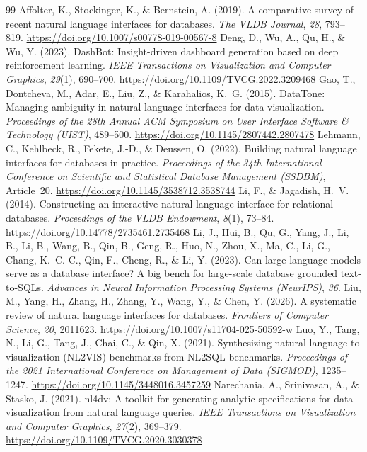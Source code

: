 \documentclass[11pt]{article}
\begin{document}
\begin{thebibliography}{99}
 Affolter, K., Stockinger, K., \& Bernstein, A. (2019). A comparative survey of recent natural language interfaces for databases. \emph{The VLDB Journal}, \emph{28}, 793--819. \url{https://doi.org/10.1007/s00778-019-00567-8}
 Deng, D., Wu, A., Qu, H., \& Wu, Y. (2023). DashBot: Insight-driven dashboard generation based on deep reinforcement learning. \emph{IEEE Transactions on Visualization and Computer Graphics}, \emph{29}(1), 690--700. \url{https://doi.org/10.1109/TVCG.2022.3209468}
 Gao, T., Dontcheva, M., Adar, E., Liu, Z., \& Karahalios, K.~G. (2015). DataTone: Managing ambiguity in natural language interfaces for data visualization. \emph{Proceedings of the 28th Annual ACM Symposium on User Interface Software \& Technology (UIST)}, 489--500. \url{https://doi.org/10.1145/2807442.2807478}
 Lehmann, C., Kehlbeck, R., Fekete, J.-D., \& Deussen, O. (2022). Building natural language interfaces for databases in practice. \emph{Proceedings of the 34th International Conference on Scientific and Statistical Database Management (SSDBM)}, Article~20. \url{https://doi.org/10.1145/3538712.3538744}
 Li, F., \& Jagadish, H.~V. (2014). Constructing an interactive natural language interface for relational databases. \emph{Proceedings of the VLDB Endowment}, \emph{8}(1), 73--84. \url{https://doi.org/10.14778/2735461.2735468}
 Li, J., Hui, B., Qu, G., Yang, J., Li, B., Li, B., Wang, B., Qin, B., Geng, R., Huo, N., Zhou, X., Ma, C., Li, G., Chang, K.~C.-C., Qin, F., Cheng, R., \& Li, Y. (2023). Can large language models serve as a database interface? A big bench for large-scale database grounded text-to-SQLs. \emph{Advances in Neural Information Processing Systems (NeurIPS)}, \emph{36}.
 Liu, M., Yang, H., Zhang, H., Zhang, Y., Wang, Y., \& Chen, Y. (2026). A systematic review of natural language interfaces for databases. \emph{Frontiers of Computer Science}, \emph{20}, 2011623. \url{https://doi.org/10.1007/s11704-025-50592-w}
 Luo, Y., Tang, N., Li, G., Tang, J., Chai, C., \& Qin, X. (2021). Synthesizing natural language to visualization (NL2VIS) benchmarks from NL2SQL benchmarks. \emph{Proceedings of the 2021 International Conference on Management of Data (SIGMOD)}, 1235--1247. \url{https://doi.org/10.1145/3448016.3457259}
 Narechania, A., Srinivasan, A., \& Stasko, J. (2021). nl4dv: A toolkit for generating analytic specifications for data visualization from natural language queries. \emph{IEEE Transactions on Visualization and Computer Graphics}, \emph{27}(2), 369--379. \url{https://doi.org/10.1109/TVCG.2020.3030378}

\end{thebibliography}
\end{document}
